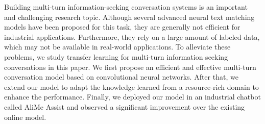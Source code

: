 Building multi-turn information-seeking conversation systems is an important and challenging research topic. Although several advanced neural text matching models have been proposed for this task, they are generally not efficient for industrial applications. Furthermore, they rely on a large amount of labeled data, which may not be available in real-world applications. To alleviate these problems, we study transfer learning for multi-turn information seeking conversations in this paper. We first propose an efficient and effective multi-turn conversation model based on convolutional neural networks. After that, we extend our model to adapt the knowledge learned from a resource-rich domain to enhance the performance. Finally, we deployed our model in an industrial chatbot called AliMe Assist and observed a significant improvement over the existing online model.
